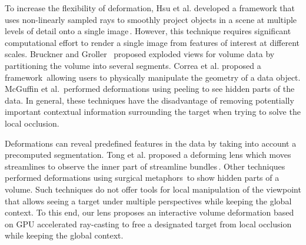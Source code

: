 To increase the flexibility of deformation, Hsu et al. developed a framework that uses non-linearly sampled rays to smoothly project objects in a scene at multiple levels of detail onto a single image\,\cite{Hsu:2011:RFM:2070781.2024165}. However, this technique requires significant computational effort to render a single image from features of interest at different scales. Bruckner and  Groller~\cite{4015467} proposed exploded views for volume data by partitioning the volume into several segments. Correa et al. proposed a framework\,\cite{Correa:2007:IDD:1313046.1313163} allowing  users to physically manipulate the geometry of a data object. McGuffin et al.\,\cite{1250400} performed deformations using peeling to see hidden parts of the data. In general, these techniques have the disadvantage of removing potentially important contextual information surrounding the target when trying to solve the local occlusion.

Deformations can reveal predefined features in the data by taking into account a precomputed segmentation. Tong et al. proposed a deforming lens which moves streamlines to observe the inner part of streamline bundles\,\cite{7332955}. Other techniques performed deformations using surgical metaphors\,\cite{4069230,Correa:2006:FAV:1187627.1187827} to show hidden parts of a volume. Such techniques do not offer tools for local manipulation of the viewpoint that allows seeing a target under multiple perspectives while keeping the global context. To this end, our lens proposes an interactive volume deformation based on GPU accelerated ray-casting to free a designated target from local occlusion while keeping the global context.

\vspace{-0.15cm}

